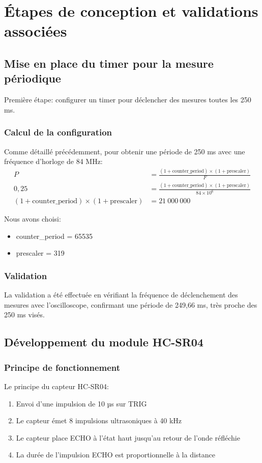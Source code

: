 \documentclass{article}
\begin{document}
\section{Étapes de conception et validations associées}

\subsection{Mise en place du timer pour la mesure périodique}
Première étape: configurer un timer pour déclencher des mesures toutes les 250 ms.

\subsubsection{Calcul de la configuration}
Comme détaillé précédemment, pour obtenir une période de 250 ms avec une fréquence d'horloge de 84 MHz:
\begin{align*}
P &= \frac{(1 + \text{counter\_period}) \times (1 + \text{prescaler})}{F} \\
0,25 &= \frac{(1 + \text{counter\_period}) \times (1 + \text{prescaler})}{84 \times 10^6} \\
(1 + \text{counter\_period}) \times (1 + \text{prescaler}) &= 21~000~000
\end{align*}

Nous avons choisi:
\begin{itemize}
    \item counter\_period = 65535
    \item prescaler = 319
\end{itemize}

\subsubsection{Validation}
La validation a été effectuée en vérifiant la fréquence de déclenchement des mesures avec l'oscilloscope, confirmant une période de 249,66 ms, très proche des 250 ms visés.

\subsection{Développement du module HC-SR04}
\subsubsection{Principe de fonctionnement}
Le principe du capteur HC-SR04:
\begin{enumerate}
    \item Envoi d'une impulsion de 10 µs sur TRIG
    \item Le capteur émet 8 impulsions ultrasoniques à 40 kHz
    \item Le capteur place ECHO à l'état haut jusqu'au retour de l'onde réfléchie
    \item La durée de l'impulsion ECHO est proportionnelle à la distance
\end{enumerate}
\end{document}
